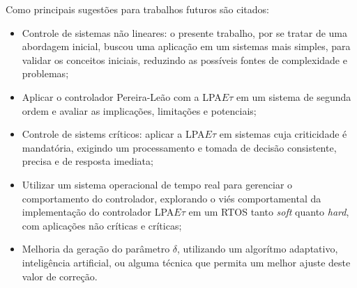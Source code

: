 Como principais sugestões para trabalhos futuros são citados:

\begin{itemize}

\item Controle de sistemas não lineares: o presente trabalho, por se tratar de uma abordagem inicial, buscou uma aplicação em um sistemas mais simples, para validar os conceitos iniciais, reduzindo as possíveis fontes de complexidade e problemas;

\item Aplicar o controlador Pereira-Leão com a LPA$E\tau$ em um sistema de segunda ordem e avaliar as implicações, limitações e potenciais;
  
\item Controle de sistems críticos: aplicar a LPA$E\tau$ em sistemas cuja criticidade é mandatória, exigindo um processamento e tomada de decisão consistente, precisa e de resposta imediata;

\item Utilizar um sistema operacional de tempo real para gerenciar o comportamento do controlador, explorando o viés comportamental da implementação do controlador LPA$E\tau$ em um RTOS tanto \emph{soft} quanto \emph{hard}, com aplicações não críticas e críticas;

  
\item Melhoria da geração do parâmetro $\delta$, utilizando um algorítmo adaptativo, inteligência artificial, ou alguma técnica que permita um melhor ajuste deste valor de correção.
  
\end{itemize}





